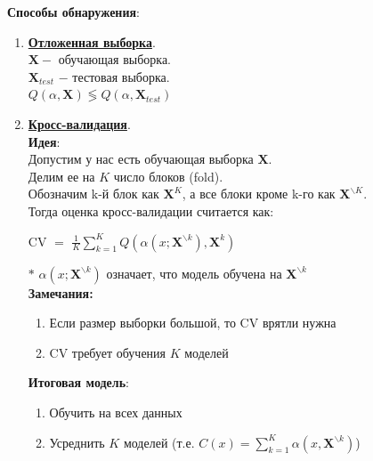             \textbf{Способы обнаружения}:
            \begin{enumerate}
                \item \underline{\textbf{Отложенная выборка}}.\\
                    $\mathbf{X} - $ обучающая выборка.\\
                    $\mathbf{X}_{test}$ $-$ тестовая выборка.\\

                    $Q(\alpha, \mathbf{X}) \lessgtr Q(\alpha, \mathbf{X}_{test})$

                \item \underline{\textbf{Кросс-валидация}}.\\
                    \textbf{Идея}:\\
                    Допустим у нас есть обучающая выборка $\mathbf{X}$.\\
                    Делим ее на $K$ число блоков (fold).\\
                    Обозначим k-й блок как $\mathbf{X}^K$, а все блоки кроме k-го как $\mathbf{X}^{\backslash K}$.\\
                    Тогда оценка кросс-валидации считается как:
                    \begin{center}
                        \large{CV $=$ $\frac{1}{K} \sum\limits_{k=1}^KQ(\alpha(x; \mathbf{X}^{\backslash k}), \mathbf{X}^k)$}
                    \end{center}
                    $\ast$ $\alpha(x; \mathbf{X}^{\backslash k})$ означает, что модель обучена на $\mathbf{X}^{\backslash k}$\\

                    \textbf{Замечания:}
                    \begin{enumerate}
                        \item Если размер выборки большой, то CV врятли нужна

                        \item CV требует обучения $K$ моделей
                    \end{enumerate}

                    \textbf{Итоговая модель}:\\
                    \begin{enumerate}
                        \item Обучить на всех данных
                        \item Усреднить $K$ моделей (т.е. $C(x) = \sum\limits_{k=1}^K\alpha(x, \mathbf{X}^{\backslash k})$)
                    \end{enumerate}
                
            \end{enumerate}


